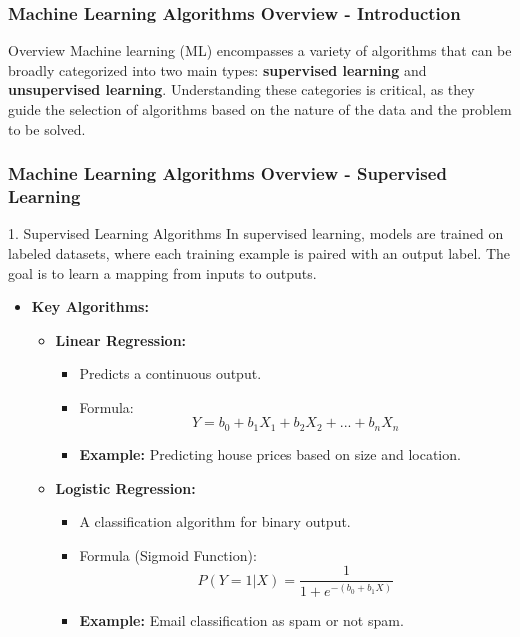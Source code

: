 \documentclass[aspectratio=169]{beamer}
\begin{document}
\begin{frame}[fragile]
    \frametitle{Machine Learning Algorithms Overview - Introduction}
    \begin{block}{Overview}
        Machine learning (ML) encompasses a variety of algorithms that can be broadly categorized into two main types: 
        \textbf{supervised learning} and \textbf{unsupervised learning}. 
        Understanding these categories is critical, as they guide the selection of algorithms based on the nature of the data and the problem to be solved.
    \end{block}
\end{frame}

\begin{frame}[fragile]
    \frametitle{Machine Learning Algorithms Overview - Supervised Learning}
    \begin{block}{1. Supervised Learning Algorithms}
        In supervised learning, models are trained on labeled datasets, where each training example is paired with an output label. 
        The goal is to learn a mapping from inputs to outputs.
    \end{block}
    \begin{itemize}
        \item \textbf{Key Algorithms:}
        \begin{itemize}
            \item \textbf{Linear Regression:}
            \begin{itemize}
                \item Predicts a continuous output.
                \item Formula: 
                \begin{equation}
                    Y = b_0 + b_1X_1 + b_2X_2 + ... + b_nX_n
                \end{equation}
                \item \textbf{Example:} Predicting house prices based on size and location.
            \end{itemize}
            \item \textbf{Logistic Regression:}
            \begin{itemize}
                \item A classification algorithm for binary output.
                \item Formula (Sigmoid Function): 
                \begin{equation}
                    P(Y=1|X) = \frac{1}{1 + e^{-(b_0 + b_1X)}}
                \end{equation}
                \item \textbf{Example:} Email classification as spam or not spam.
            \end{itemize}
        \end{itemize}
    \end{itemize}
\end{frame}
\end{document}
